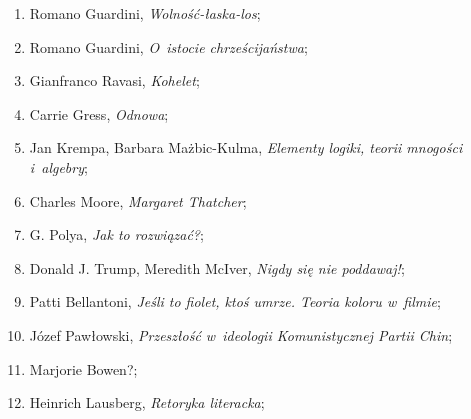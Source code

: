 \documentclass[a4paper,11pt]{article}
\begin{document}
\begin{enumerate}
\item Romano Guardini, \textit{Wolność-łaska-los};



\item Romano Guardini, \textit{O~istocie chrześcijaństwa};



\item Gianfranco Ravasi, \textit{Kohelet};



\item Carrie Gress, \textit{Odnowa};



\item Jan Krempa, Barbara Mażbic-Kulma, \textit{Elementy logiki, teorii
    mnogości i~algebry};



\item Charles Moore, \textit{Margaret Thatcher};



\item G. Polya, \textit{Jak to rozwiązać?};



\item Donald J. Trump, Meredith McIver, \textit{Nigdy się nie poddawaj!};



\item Patti Bellantoni, \textit{Jeśli to fiolet, ktoś umrze. Teoria koloru
    w~filmie};



\item Józef Pawłowski, \textit{Przeszłość w~ideologii Komunistycznej Partii
    Chin};



\item Marjorie Bowen?;



\item Heinrich Lausberg, \textit{Retoryka literacka};



























\end{enumerate}
\end{document}
